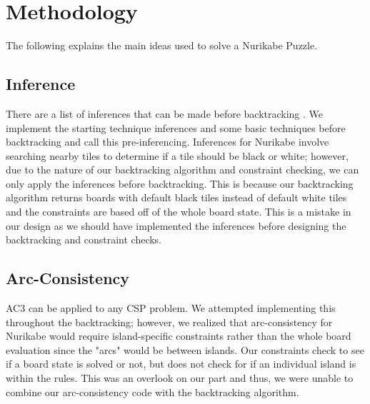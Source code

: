 \documentclass{article}
\theoremstyle{definition}
\begin{document}

\section{Methodology}

The following explains the main ideas used to solve a Nurikabe Puzzle. 

\subsection{Inference}
There are a list of inferences that can be made before backtracking \cite{Inferences}. We implement the starting technique inferences and some basic techniques before backtracking and call this pre-inferencing. Inferences for Nurikabe involve searching nearby tiles to determine if a tile should be black or white; however, due to the nature of our backtracking algorithm and constraint checking, we can only apply the inferences before backtracking. This is because our backtracking algorithm returns boards with default black tiles instead of default white tiles and the constraints are based off of the whole board state. This is a mistake in our design as we should have implemented the inferences before designing the backtracking and constraint checks. 

\subsection{Arc-Consistency}
AC3 can be applied to any CSP problem. We attempted implementing this throughout the backtracking; however, we realized that arc-consistency for Nurikabe would require island-specific constraints rather than the whole board evaluation since the "arcs" would be between islands. Our constraints check to see if a board state is solved or not, but does not check for if an individual island is within the rules. This was an overlook on our part and thus, we were unable to combine our arc-consistency code with the backtracking algorithm. 
\end{document}
